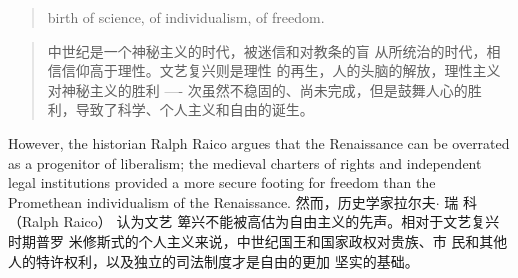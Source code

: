 \begin{paracol}{2}
\begin{quote}
birth of science, of individualism, of freedom.
\end{quote}
\switchcolumn
\begin{quote}
中世纪是一个神秘主义的时代，被迷信和对教条的盲
从所统治的时代，相信信仰高于理性。文艺复兴则是理性
的再生，人的头脑的解放，理性主义对神秘主义的胜利
---- 次虽然不稳固的、尚未完成，但是鼓舞人心的胜
利，导致了科学、个人主义和自由的诞生。
\end{quote}
\switchcolumn*
However, the historian Ralph Raico argues that the Renaissance
can be overrated as a progenitor of liberalism; the medieval
charters of rights and independent legal institutions provided a
more secure footing for freedom than the Promethean individualism of the Renaissance.
\switchcolumn
然而，历史学家拉尔夫$\cdot$ 瑞 科 （Ralph Raico） 认为文艺
箄兴不能被高估为自由主义的先声。相对于文艺复兴时期普罗
米修斯式的个人主义来说，中世纪国王和国家政权对贵族、市
民和其他人的特许权利，以及独立的司法制度才是自由的更加
坚实的基础。


\end{paracol}
